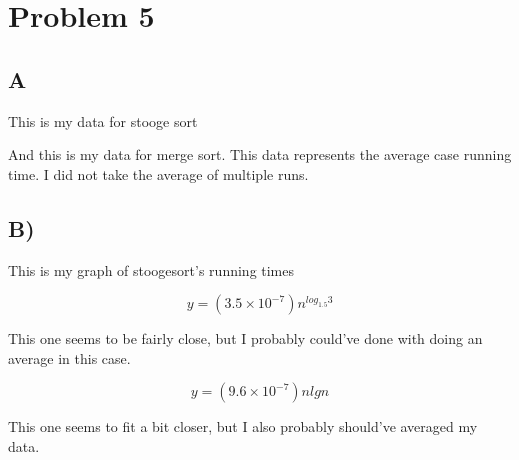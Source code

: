 \documentclass[12pt, letterpaper]{article}
\begin{document}
\section*{Problem 5}
\subsection*{A}


This is my data for stooge sort

\vspace{\baselineskip}


\vspace{\baselineskip}

And this is my data for merge sort. This data represents the average case running time. I did not take the average of multiple runs.

\subsection*{B)}
This is my graph of stoogesort's running times

\vspace{\baselineskip}


\vspace{\baselineskip}

\[ y = (3.5 \times 10^{-7})n^{log_{1.5}3} \]

This one seems to be fairly close, but I probably could've done with doing an average in this case.

\vspace{\baselineskip}

\vspace{\baselineskip}

\[ y = (9.6 \times 10^{-7})nlgn \]

This one seems to fit a bit closer, but I also probably should've averaged my data.
\end{document}
